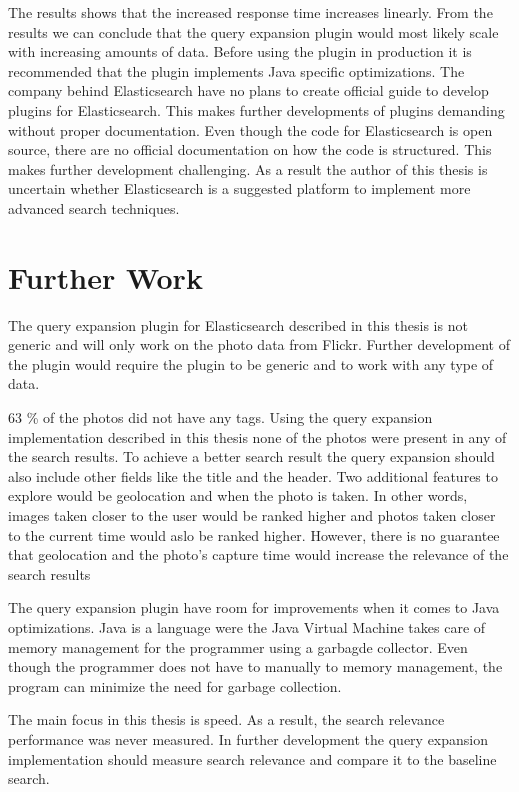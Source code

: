 The results shows that the increased response time increases linearly.
From the results we can conclude that the query expansion plugin would most likely scale with increasing amounts of data.
Before using the plugin in production it is recommended that the plugin implements Java specific optimizations.
The company behind Elasticsearch have no plans to create official guide to develop plugins for Elasticsearch.
This makes further developments of plugins demanding without proper documentation.
Even though the code for Elasticsearch is open source,
there are no official documentation on how the code is structured.
This makes further development challenging.
As a result the author of this thesis is uncertain whether Elasticsearch is a suggested platform to implement more advanced search techniques.

\section{Further Work}
The query expansion plugin for Elasticsearch described in this thesis is not generic and will only work on the photo data from Flickr.
Further development of the plugin would require the plugin to be generic and to work with any type of data.

63 \% of the photos did not have any tags.
Using the query expansion implementation described in this thesis none of the photos were present in any of the search results.
To achieve a better search result the query expansion should also include other fields like the title and the header.
Two additional features to explore would be geolocation and when the photo is taken.
In other words,
images taken closer to the user would be ranked higher and photos taken closer to the current time would aslo be ranked higher.
However, there is no guarantee that geolocation and the photo's capture time would increase the relevance of the search results

The query expansion plugin have room for improvements when it comes to Java optimizations.
Java is a language were the Java Virtual Machine takes care of memory management for the programmer using a garbagde collector.
Even though the programmer does not have to manually to memory management,
the program can minimize the need for garbage collection.

The main focus in this thesis is speed.
As a result, the search relevance performance was never measured.
In further development the query expansion implementation should measure search relevance and compare it to the baseline search.





